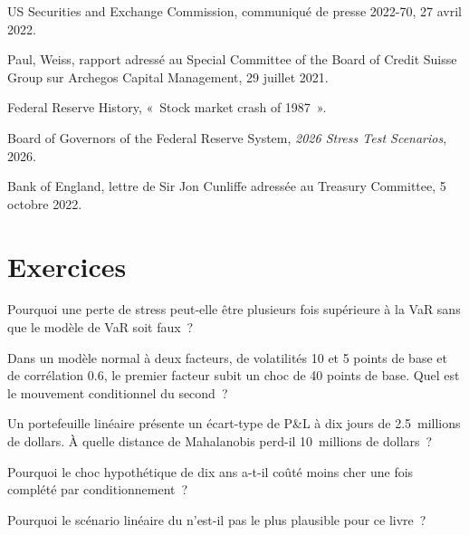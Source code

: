 \begin{omsources}
\item US Securities and Exchange Commission, communiqué de presse 2022-70, 27 avril 2022.
\item Paul, Weiss, rapport adressé au Special Committee of the Board of Credit Suisse Group sur
Archegos Capital Management, 29 juillet 2021.
\item Federal Reserve History, «~Stock market crash of 1987~».
\item Board of Governors of the Federal Reserve System, \emph{2026 Stress Test Scenarios}, 2026.
\item Bank of England, lettre de Sir Jon Cunliffe adressée au Treasury Committee, 5 octobre 2022.
\end{omsources}

\section{Exercices}

\begin{exercise}[$\star$]\label{exo:rc:stress-testing-and-scenarios:1}
Pourquoi une perte de stress peut-elle être plusieurs fois supérieure à la VaR sans que le modèle de VaR soit faux~?
\end{exercise}

\begin{exercise}[$\star$]\label{exo:rc:stress-testing-and-scenarios:2}
Dans un modèle normal à deux facteurs, de volatilités 10 et 5 points de base et de corrélation 0.6, le
premier facteur subit un choc de 40 points de base. Quel est le mouvement conditionnel du second~?
\end{exercise}

\begin{exercise}[$\star$]\label{exo:rc:stress-testing-and-scenarios:3}
Un portefeuille linéaire présente un écart-type de P\&L à dix jours de 2.5~millions de dollars. À quelle
distance de Mahalanobis perd-il 10~millions de dollars~?
\end{exercise}

\begin{exercise}[$\star\star$]\label{exo:rc:stress-testing-and-scenarios:4}
Pourquoi le choc hypothétique de dix ans a-t-il coûté moins cher une fois complété par conditionnement~?
\end{exercise}

\begin{exercise}[$\star\star$]\label{exo:rc:stress-testing-and-scenarios:5}
Pourquoi le scénario linéaire du  n'est-il pas le plus plausible pour ce livre~?
\end{exercise}

